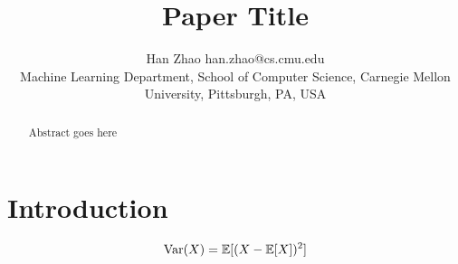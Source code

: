 \documentclass[twoside,11pt]{article}
\begin{document}
\title{Paper Title}
\author{\name Han Zhao \email han.zhao@cs.cmu.edu \\
       \addr Machine Learning Department, School of Computer Science, Carnegie Mellon University, Pittsburgh, PA, USA}
\maketitle

\begin{abstract}%
Abstract goes here
\end{abstract}


\section{Introduction}
\begin{equation*}
    \mathrm{Var}(X) = \mathbb{E}[(X - \mathbb{E}[X])^2]
\end{equation*}

{}


\end{document}
